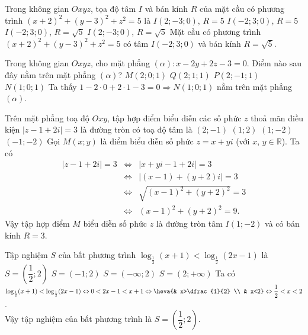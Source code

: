 \begin{ex}%
	Trong không gian $Oxyz$, tọa độ tâm $I$ và bán kính $R$ của mặt cầu có phương trình $(x+2)^2+(y-3)^2+z^2=5$ là
	\choice
	{$I(2;-3;0)$, $R=5$}
	{$I(-2;3;0)$, $R=5$}
	{\True $I(-2;3;0)$, $R=\sqrt{5}$}
	{$I(2;-3;0)$, $R=\sqrt{5}$}
	\loigiai
	{
		Mặt cầu có phương trình $(x+2)^2+(y-3)^2+z^2=5$ có tâm $I(-2;3;0)$ và bán kính $R=\sqrt{5}$.
	}
\end{ex}

\begin{ex}%
	Trong không gian $Oxyz$, cho mặt phẳng $(\alpha)\colon x-2y+2z-3=0$. Điểm nào sau đây nằm trên mặt phẳng $(\alpha)$?
	\choice
	{$M(2;0;1)$}
	{$Q(2;1;1)$}
	{$P(2;-1;1)$}
	{\True $N(1;0;1)$}
	\loigiai
	{
		Ta thấy $1-2\cdot 0+2\cdot 1-3=0\Rightarrow N(1;0;1)$ nằm trên mặt phẳng $(\alpha)$.
	}
\end{ex}

\begin{ex}%
	Trên mặt phẳng toạ độ $Oxy$, tập hợp điểm biểu diễn các số phức $z$ thoả mãn điều kiện $|z-1+2i|=3$ là đường tròn có toạ độ tâm là
	\choice
	{$(2;-1)$}
	{$(1;2)$}
	{\True $(1;-2)$}
	{$(-1;-2)$}
	\loigiai
	{
		Gọi $M(x;y)$ là điểm biểu diễn số phức $z=x+yi$ (với $x$, $y\in \mathbb{R}$). Ta có
		\begin{eqnarray*}
			|z-1+2i|=3&\Leftrightarrow &|x+yi-1+2i|=3\\
			&\Leftrightarrow &|(x-1)+(y+2)i|=3\\
			&\Leftrightarrow &\sqrt{(x-1)^2+(y+2)^2}=3\\
			&\Leftrightarrow &(x-1)^2+(y+2)^2=9.
		\end{eqnarray*}
		Vậy tập hợp điểm $M$ biểu diễn số phức $z$ là đường tròn tâm $I(1;-2)$ và có bán kính $R=3$.
	}
\end{ex}

\begin{ex}%
	Tập nghiệm $S$ của bất phương trình $\log_{\frac{1}{2}}(x+1)<\log_{\frac{1}{2}}(2x-1)$ là
	\choice
	{\True $S=\left(\dfrac{1}{2};2\right)$}
	{$S=(-1;2)$}
	{$S=(-\infty;2)$}
	{$S=(2;+\infty)$}
	\loigiai
	{
		Ta có $\log_{\frac{1}{2}}(x+1)<\log_{\frac{1}{2}}(2x-1)\Leftrightarrow 0<2x-1<x+1\Leftrightarrow \heva{& x>\dfrac{1}{2} \\ & x<2}\Leftrightarrow \dfrac{1}{2}<x<2$.\\
		Vậy tập nghiệm của bất phương trình là $S=\left(\dfrac{1}{2};2\right)$.
	}
\end{ex}

